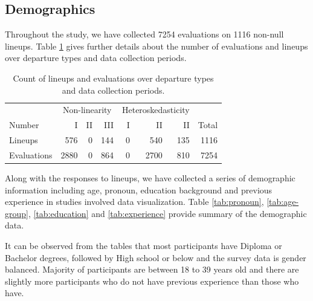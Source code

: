 \documentclass[]{interact}
\theoremstyle{plain}%
\theoremstyle{definition}
\theoremstyle{remark}
\begin{document}
\hypertarget{demographics}{%
\subsection{Demographics}\label{demographics}}

Throughout the study, we have collected 7254 evaluations on 1116
non-null lineups. Table \ref{tab:count-lineup} gives further details
about the number of evaluations and lineups over departure types and
data collection periods.

\begin{table}

\caption{\label{tab:count-lineup}Count of lineups and evaluations over departure types and data collection periods.}
\centering
\begin{tabular}[t]{lrrrrrrr}
\toprule
\multicolumn{1}{c}{ } & \multicolumn{3}{c}{Non-linearity} & \multicolumn{3}{c}{Heteroskedasticity} \\
\cmidrule(l{3pt}r{3pt}){2-4} \cmidrule(l{3pt}r{3pt}){5-7}
Number & I & II & III & I & II & II & Total\\
\midrule
Lineups & 576 & 0 & 144 & 0 & 540 & 135 & 1116\\
Evaluations & 2880 & 0 & 864 & 0 & 2700 & 810 & 7254\\
\bottomrule
\end{tabular}
\end{table}

Along with the responses to lineups, we have collected a series of
demographic information including age, pronoun, education background and
previous experience in studies involved data visualization. Table
\ref{tab:pronoun}, \ref{tab:age-group}, \ref{tab:education} and
\ref{tab:experience} provide summary of the demographic data.

It can be observed from the tables that most participants have Diploma
or Bachelor degrees, followed by High school or below and the survey
data is gender balanced. Majority of participants are between 18 to 39
years old and there are slightly more participants who do not have
previous experience than those who have.

\begin{table}

\caption{\label{tab:pronoun}Summary of pronoun distribution of subjects recuritted in this study.}
\centering
{}
\end{table}
\end{document}
